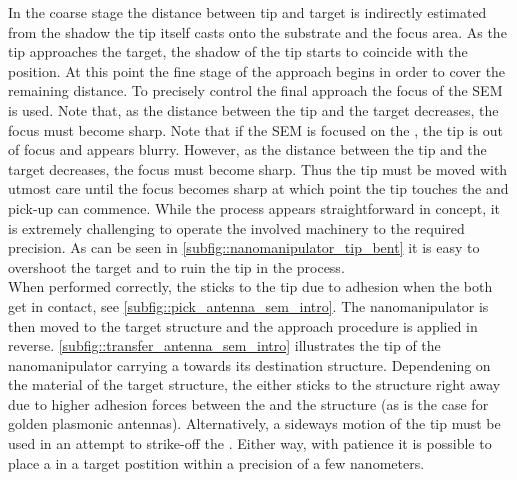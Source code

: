 	In the coarse stage the distance between tip and target \nd is indirectly estimated from the shadow the tip itself casts onto the substrate and the focus area. As the tip approaches the target, the shadow of the tip starts to coincide with the \nd position. At this point the fine stage of the approach begins in order to cover the remaining distance. To precisely control the final approach the focus of the SEM is used. Note that, as the distance between the tip and the target decreases, the focus must become sharp. Note that if the SEM is focused on the \nd, the tip is out of focus and appears blurry. However, as the distance between the tip and the target decreases, the focus must become sharp. Thus the tip must be moved with utmost care until the focus becomes sharp at which point the tip touches the \nd and pick-up can commence. While the process appears straightforward in concept, it is extremely challenging to operate the involved machinery to the required precision. As can be seen in \autoref{subfig::nanomanipulator_tip_bent} it is easy to overshoot the target and to ruin the tip in the process.
	\\
	When performed correctly, the \nd sticks to the tip due to adhesion when the both get in contact, see \autoref{subfig::pick_antenna_sem_intro}.
	The nanomanipulator is then moved to the target structure and the approach procedure is applied in reverse. \autoref{subfig::transfer_antenna_sem_intro} illustrates the tip of the nanomanipulator carrying a \nd towards its destination structure.
	Dependening on the material of the target structure, the \nd either sticks to the structure right away due to higher adhesion forces between the \nd and the structure (as is the case for golden plasmonic antennas).
	Alternatively, a sideways motion of the \np tip must be used in an attempt to strike-off the \nd.
	Either way, with patience it is possible to place a \nd in a target postition within a precision of a few nanometers.
	\\

